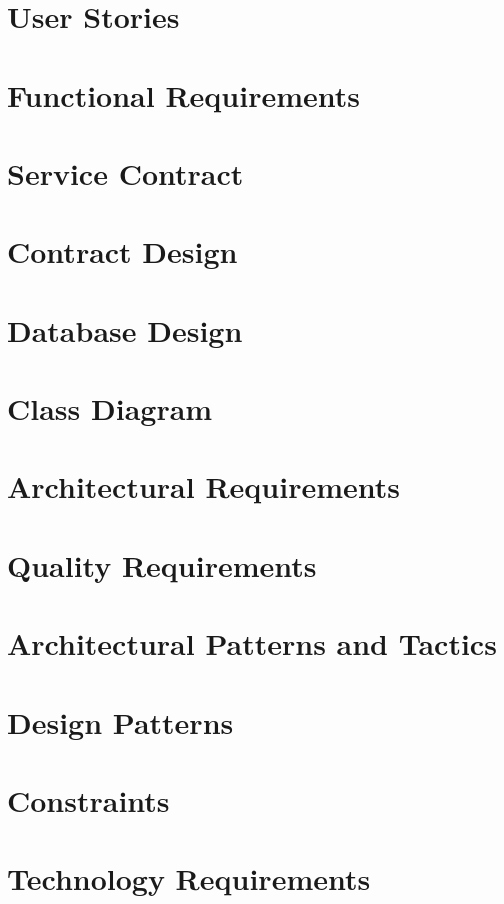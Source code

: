 \documentclass[12pt]{article}
\begin{document}
\newpage

\section{User Stories}

\newpage

\section{Functional Requirements}

\newpage

\section{Service Contract}

\newpage

\section{Contract Design}

\newpage

\section{Database Design}

\newpage

\section{Class Diagram}

\newpage

\section{Architectural Requirements}

\newpage

\section{Quality Requirements}

\newpage

\section{Architectural Patterns and Tactics}

\newpage

\section{Design Patterns}

\newpage

\section{Constraints}

\newpage

\section{Technology Requirements}

\newpage
\end{document}
